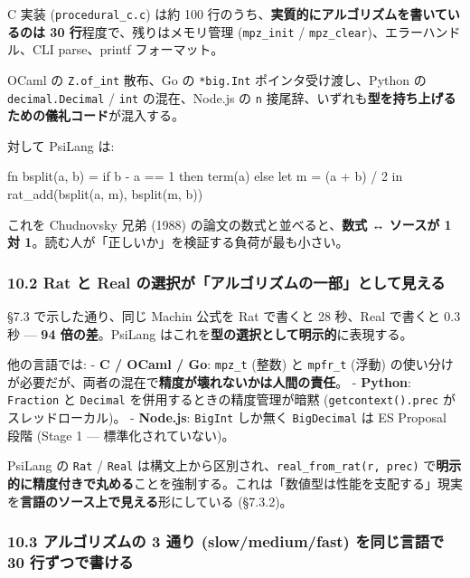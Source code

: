 \documentclass[
]{ltjsarticle}
\newenvironment{Shaded}{}{}
\newcommand{\NormalTok}[1]{#1}
\begin{document}
C 実装 (\texttt{procedural\_c.c}) は約 100
行のうち、\textbf{実質的にアルゴリズムを書いているのは 30
行}程度で、残りはメモリ管理 (\texttt{mpz\_init} /
\texttt{mpz\_clear})、エラーハンドル、CLI parse、printf フォーマット。

OCaml の \texttt{Z.of\_int} 散布、Go の \texttt{*big.Int}
ポインタ受け渡し、Python の \texttt{decimal.Decimal} / \texttt{int}
の混在、Node.js の \texttt{n}
接尾辞、いずれも\textbf{型を持ち上げるための儀礼コード}が混入する。

対して PsiLang は:

\begin{Shaded}
\begin{Highlighting}[]
\NormalTok{fn bsplit(a, b) =}
\NormalTok{  if b {-} a == 1 then term(a)}
\NormalTok{  else}
\NormalTok{    let m = (a + b) / 2 in}
\NormalTok{    rat\_add(bsplit(a, m), bsplit(m, b))}
\end{Highlighting}
\end{Shaded}

これを Chudnovsky 兄弟 (1988) の論文の数式と並べると、\textbf{数式 ↔
ソースが 1 対 1}。読む人が「正しいか」を検証する負荷が最も小さい。

\subsubsection{10.2 Rat と Real
の選択が「アルゴリズムの一部」として見える}\label{rat-ux3068-real-ux306eux9078ux629eux304cux30a2ux30ebux30b4ux30eaux30baux30e0ux306eux4e00ux90e8ux3068ux3057ux3066ux898bux3048ux308b}

§7.3 で示した通り、同じ Machin 公式を Rat で書くと 28 秒、Real で書くと
0.3 秒 --- \textbf{94 倍の差}。PsiLang
はこれを\textbf{型の選択として明示的}に表現する。

他の言語では: - \textbf{C / OCaml / Go}: \texttt{mpz\_t} (整数) と
\texttt{mpfr\_t} (浮動)
の使い分けが必要だが、両者の混在で\textbf{精度が壊れないかは人間の責任}。
- \textbf{Python}: \texttt{Fraction} と \texttt{Decimal}
を併用するときの精度管理が暗黙 (\texttt{getcontext().prec}
がスレッドローカル)。 - \textbf{Node.js}: \texttt{BigInt} しか無く
\texttt{BigDecimal} は ES Proposal 段階 (Stage 1 ---
標準化されていない)。

PsiLang の \texttt{Rat} / \texttt{Real}
は構文上から区別され、\texttt{real\_from\_rat(r,\ prec)}
で\textbf{明示的に精度付きで丸める}ことを強制する。これは「数値型は性能を支配する」現実を\textbf{言語のソース上で見える}形にしている
(§7.3.2)。

\subsubsection{\texorpdfstring{10.3 アルゴリズムの \textbf{3 通り
(slow/medium/fast) を同じ言語で 30
行ずつ}で書ける}{10.3 アルゴリズムの 3 通り (slow/medium/fast) を同じ言語で 30 行ずつで書ける}}\label{ux30a2ux30ebux30b4ux30eaux30baux30e0ux306e-3-ux901aux308a-slowmediumfast-ux3092ux540cux3058ux8a00ux8a9eux3067-30-ux884cux305aux3064ux3067ux66f8ux3051ux308b}
\end{document}
